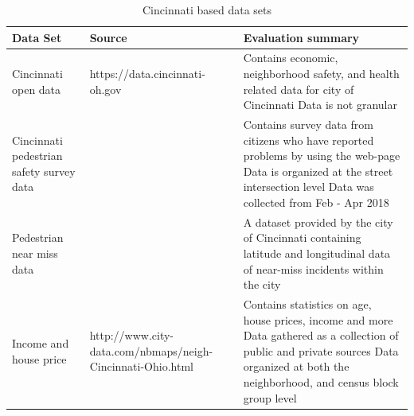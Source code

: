 \documentclass{llncs}
\begin{document}
\FloatBarrier
\begin{table}[!h]
\begin{center}
\caption{Cincinnati based data sets}
\label{table:cincinnatidatasets}
\begin{tabular}{ p{}  p{}  p{}}
\hline
\rule{0pt}{12pt}
Data Set
	& Source
	& Evaluation summary\\[2pt]
\hline
Cincinnati open data
	& https://data.cincinnati-oh.gov
	& Contains economic, neighborhood safety, and health related data for city of Cincinnati\newline
	Data is not granular\\
Cincinnati pedestrian safety survey data
	&
	& 
	Contains survey data from citizens who have reported problems by using the web-page\newline
	Data is organized at  the street intersection level\newline
	  Data was collected from Feb - Apr 2018\\
Pedestrian near miss data
	&
	& A dataset provided by the city of Cincinnati containing latitude and longitudinal data of near-miss incidents within the city\\
Income and house price
	& http://www.city-data.com/nbmaps/neigh-Cincinnati-Ohio.html
	& Contains statistics on age, house prices, income and more\newline
	Data gathered as a collection of public and private sources\newline
	Data organized at both the neighborhood, and census block group level\\[2pt]
\hline
\end{tabular}
\end{center}
\end{table}
\FloatBarrier
%
\FloatBarrier
\end{document}
